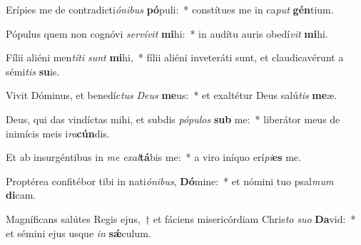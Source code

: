 \item Erípies me de contradicti\textit{ó}\textit{ni}\textit{bus} \textbf{pó}puli:~* constítues me in ca\textit{put} \textbf{gén}tium.
\item Pópulus quem non cognóvi \textit{ser}\textit{ví}\textit{vit} \textbf{mi}hi:~* in audítu auris obedí\textit{vit} \textbf{mi}hi.
\item Fílii aliéni men\textit{tí}\textit{ti} \textit{sunt} \textbf{mi}hi,~* fílii aliéni inveteráti sunt, et claudicavérunt a sémi\textit{tis} \textbf{su}is.
\item Vivit Dóminus, et benedíc\textit{tus} \textit{De}\textit{us} \textbf{me}us:~* et exaltétur Deus salú\textit{tis} \textbf{me}æ.
\item Deus, qui das vindíctas mihi, et subdis \textit{pó}\textit{pu}\textit{los} \textbf{sub} me:~* liberátor meus de inimícis meis i\textit{ra}\textbf{cún}dis.
\item Et ab insurgéntibus in \textit{me} \textit{ex}\textit{al}\textbf{tá}bis me:~* a viro iníquo erí\textit{pi}\textbf{es} me.
\item Proptérea confitébor tibi in nati\textit{ó}\textit{ni}\textit{bus}, \textbf{Dó}mine:~* et nómini tuo psal\textit{mum} \textbf{di}cam.
\item Magníficans salútes Regis ejus,~† et fáciens misericórdiam Chris\textit{to} \textit{su}\textit{o} \textbf{Da}vid:~* et sémini ejus usque \textit{in} \textbf{sǽ}culum.
